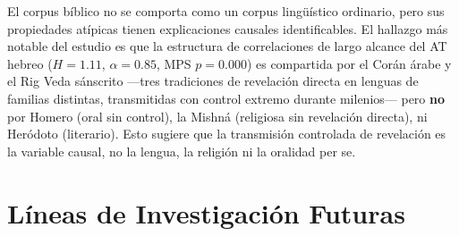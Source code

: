 \documentclass[12pt,a4paper]{article}
\begin{document}
El corpus b\'iblico no se comporta como un corpus ling\"u\'istico ordinario,
pero sus propiedades at\'ipicas tienen explicaciones causales identificables.
El hallazgo m\'as notable del estudio es que la estructura de correlaciones
de largo alcance del AT hebreo ($H = 1.11$, $\alpha = 0.85$, MPS $p = 0.000$)
es compartida por el Cor\'an \'arabe y el Rig Veda s\'anscrito ---tres tradiciones
de revelaci\'on directa en lenguas de familias distintas, transmitidas con
control extremo durante milenios--- pero \textbf{no} por Homero (oral sin control),
la Mishn\'a (religiosa sin revelaci\'on directa), ni Her\'odoto (literario).
Esto sugiere que la transmisi\'on controlada de revelaci\'on es la variable
causal, no la lengua, la religi\'on ni la oralidad per se.


\section{L\'ineas de Investigaci\'on Futuras}
\end{document}
